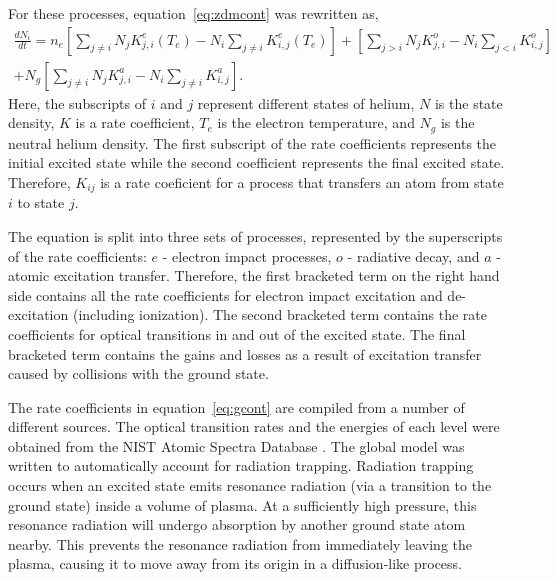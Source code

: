 For these processes, equation~\ref{eq:zdmcont} was rewritten as,
\begin{multline}
  \frac{dN_i}{dt} =   n_e \left[       \sum_{j\neq i} N_j K^e_{j,i}(T_e) 
                                 - N_i \sum_{j\neq i}     K^e_{i,j}(T_e) \right]
                        + \left[       \sum_{j > i}   N_j K^o_{j,i} 
                                 - N_i \sum_{j < i}       K^o_{i,j}      \right] \\
                    + N_g \left[       \sum_{j\neq i} N_j K^a_{j,i} 
                                 - N_i \sum_{j\neq i}     K^a_{i,j}      \right].
  \label{eq:gcont}
\end{multline}
Here, the subscripts of $i$ and $j$ represent different states of helium, $N$ is
the state density, $K$ is a rate coefficient, $T_e$ is the electron temperature,
and $N_g$ is the neutral helium density. The first subscript of the rate
coefficients represents the initial excited state while the second coefficient
represents the final excited state. Therefore, $K_{ij}$ is a rate coeficient for
a process that transfers an atom from state $i$ to state $j$.

The equation is split into three sets of processes, represented by the
superscripts of the rate coefficients: $e$ - electron impact processes, $o$ -
radiative decay, and $a$ - atomic excitation transfer. Therefore, the first
bracketed term on the right hand side contains all the rate coefficients for
electron impact excitation and de-excitation (including ionization). The second
bracketed term contains the rate coefficients for optical transitions in and out
of the excited state. The final bracketed term contains the gains and losses as
a result of excitation transfer caused by collisions with the ground state.

The rate coefficients in equation~\ref{eq:gcont} are compiled from a number of
different sources. The optical transition rates and the energies of each level
were obtained from the NIST Atomic Spectra Database \cite{Kramida2012}. The
global model was written to automatically account for radiation trapping.
Radiation trapping occurs when an excited state emits resonance radiation (via a
transition to the ground state) inside a volume of plasma. At a sufficiently
high pressure, this resonance radiation will undergo absorption by another
ground state atom nearby. This prevents the resonance radiation from immediately
leaving the plasma, causing it to move away from its origin in a diffusion-like
process.

